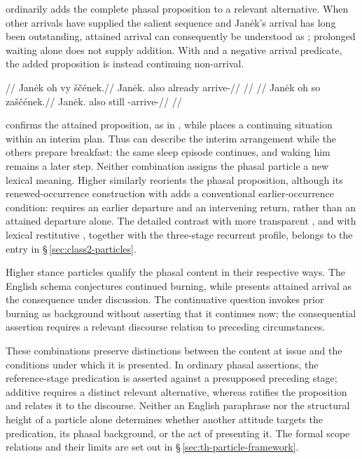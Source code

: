  ordinarily adds the complete phasal proposition to a relevant
alternative. When other arrivals have supplied the salient sequence and
Janėk's arrival has long been outstanding, attained arrival can consequently
be understood as ; prolonged waiting alone does not supply
addition. With  and a negative arrival predicate, the added
proposition is instead continuing non-arrival.

\pex
\a
\begingl
\glpreamble {}//
\gla Janėk oh vy ščének.//
\glb Janėk.\Dir{} also already arrive-\Pf{}//
\glft {}//
\endgl
\a
\begingl
\glpreamble {}//
\gla Janėk oh so zaščének.//
\glb Janėk.\Dir{} also still \Neg{}-arrive-\Pf{}//
\glft {}//
\endgl
\xe

 confirms the attained proposition, as in  , while  places a
continuing situation within an interim plan. Thus 
 can describe the interim arrangement
while the others prepare breakfast: the same sleep episode continues, and
waking him remains a later step. Neither combination assigns the phasal
particle a new lexical meaning. Higher  similarly reorients the
phasal proposition, although its renewed-occurrence construction with
 adds a conventional earlier-occurrence condition:
 requires an earlier departure and an intervening
return, rather than an attained departure alone. The detailed contrast with
more transparent , and with lexical restitutive
, together with the three-stage recurrent profile, belongs to the  entry in
§\,\ref{sec:class2-particles}.

Higher stance particles qualify the phasal content in their respective
ways. The English schema 
conjectures continued burning, while 
 presents attained arrival as the
consequence under discussion. The continuative question invokes prior burning as background without
asserting that it continues now; the consequential assertion requires a
relevant discourse relation to preceding circumstances.

These combinations preserve distinctions between the content at issue and
the conditions under which it is presented. In ordinary phasal assertions,
the reference-stage predication is asserted against a presupposed preceding
stage; additive  requires a distinct relevant alternative, whereas
 ratifies the proposition and  relates it to the
discourse. Neither an English paraphrase nor the structural height of a
particle alone determines whether another attitude targets the predication,
its phasal background, or the act of presenting it. The formal scope
relations and their limits are set out in
§\,\ref{sec:th-particle-framework}.


